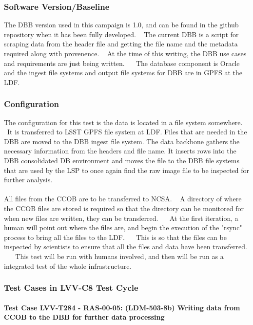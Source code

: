 \documentclass[DM,STR,toc]{lsstdoc}
\begin{document}
  \subsubsection{Software Version/Baseline}
    The DBB version used in this campaign is 1.0, and can be found in the
github repository when it has been fully developed. ~ The current DBB is
a script for scraping data from the header file and getting the file
name and the metadata required along with provenence. ~ At the time of
this writing, the DBB use cases and requirements are just being written.
~ ~The database component is Oracle and the ingest file systems and
output file systems for DBB are in GPFS at the LDF. ~


  \subsubsection{Configuration}
    The configuration for this test is the data is located in a file system
somewhere. ~It is transferred to LSST GPFS file system at LDF. Files
that are needed in the DBB are moved to the DBB ingest file system. The
data backbone gathers the necessary information from the headers and
file name. It inserts rows into the DBB consolidated DB environment and
moves the file to the DBB file systems that are used by the LSP to once
again find the raw image file to be inspected for further analysis. ~\\
~\\
All files from the CCOB are to be transferred to NCSA. ~ A directory of
where the CCOB files are stored is required so that the directory can be
monitored for when new files are written, they can be transferred. ~ ~At
the first iteration, a human will point out where the files are, and
begin the execution of the "rsync" process to bring all the files to the
LDF. ~ ~This is so that the files can be inspected by scientists to
ensure that all the files and data have been transferred. ~ ~ This test
will be run with humans involved, and then will be run as a integrated
test of the whole infrastructure. ~


  \subsubsection{Test Cases in LVV-C8 Test Cycle}


    \paragraph{Test Case LVV-T284 - RAS-00-05: (LDM-503-8b) Writing data from CCOB to the DBB for further
data processing
 }\mbox{}\\
\end{document}

